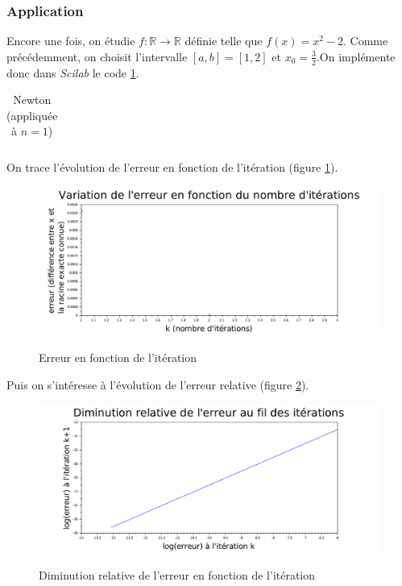 \documentclass[a4paper,10pt]{report}
\begin{document}
\subsubsection{Application}
Encore une fois, on étudie $f : \mathbb{R} \longrightarrow \mathbb{R}$ définie telle que $f(x)=x^2-2$. Comme précédemment, on choisit l'intervalle $[a,b]=[1,2]$ et $x_0=\frac{3}{2}$.On implémente donc dans \textit{Scilab} le code \ref{code_newton}.

\begin{table}[H]
\caption{Newton (appliquée à $n=1$)}
\begin{tabular}{l}

\label{code_newton}
\end{tabular}
\end{table}

On trace l'évolution de l'erreur en fonction de l'itération (figure \ref{graph_newton}).
\begin{figure}[H]
\centering
\caption{Erreur en fonction de l'itération}
\includegraphics[width=\textwidth]{graphnewton.pdf}
\label{graph_newton}
\end{figure}

Puis on s'intéresse à l'évolution de l'erreur relative (figure \ref{erreur_newton}).
\begin{figure}[H]
\centering
\caption{Diminution relative de l'erreur en fonction de l'itération}
\includegraphics[width=\textwidth]{graphnewton_reg.pdf}
\label{erreur_newton}
\end{figure}
\end{document}
